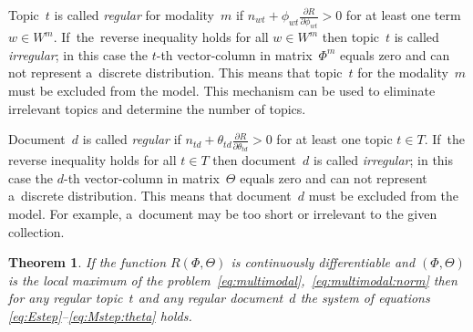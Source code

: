 \documentclass{acm_proc_article-sp}
\newtheorem{theorem}{Theorem}
\begin{document}
Topic~$t$ is called \emph{regular} for modality~$m$
if $n_{wt} + \phi_{wt} \frac{\partial R}{\partial \phi_{wt}} > 0$
for at least one term ${w\in W^m}$.
If~the~reverse inequality holds for all ${w\in W^m}$ then
topic~$t$ is called \emph{irregular};
in this case the $t$-th vector-column in matrix~$\Phi^m$ equals zero
and can not represent a~discrete distribution.
This means that topic~$t$ for the modality~$m$ must be excluded from the model.
This mechanism can be used to eliminate irrelevant topics and determine the number of topics.

Document~$d$ is called \emph{regular}
if $n_{td} + \theta_{td} \frac{\partial R}{\partial \theta_{td}} > 0$
for at least one topic ${t\in T}$.
If~the reverse inequality holds for all ${t\in T}$ then
document~$d$ is called \emph{irregular};
in this case the $d$-th vector-column in matrix~$\Theta$ equals zero
and can not represent a~discrete distribution.
This means that document~$d$ must be excluded from the model.
For example, a~document may be too short or irrelevant to the given collection.

\begin{theorem}
\label{th:multimodal}
    If the function $R(\Phi,\Theta)$ is continuously differentiable
    and $(\Phi,\Theta)$ is the local maximum
    of the problem~\eqref{eq:multimodal},~\eqref{eq:multimodal:norm}
    then for any regular topic~$t$ and any regular document~$d$
    the system of equations \eqref{eq:Estep}--\eqref{eq:Mstep:theta} holds.
\end{theorem}
\end{document}
